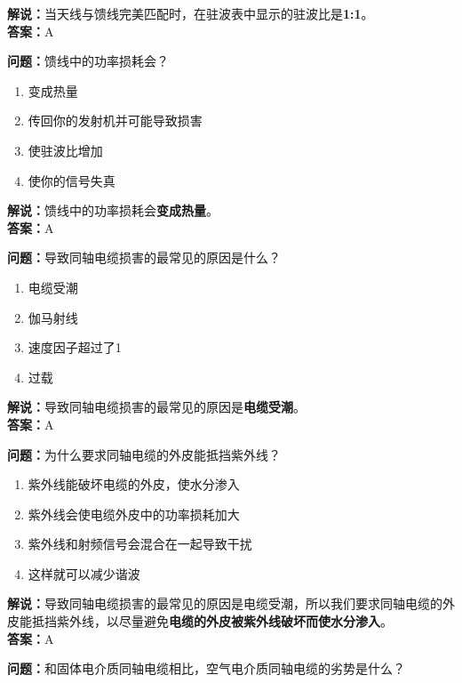 \textbf{解说：}当天线与馈线完美匹配时，在驻波表中显示的驻波比是\textbf{1:1}。\\\textbf{答案：}A



\textbf{问题：}馈线中的功率损耗会？

\begin{enumerate}[label=\Alph*), leftmargin=1cm]
	\item 变成热量
	\item 传回你的发射机并可能导致损害
	\item 使驻波比增加
	\item 使你的信号失真
\end{enumerate}

\textbf{解说：}馈线中的功率损耗会\textbf{变成热量}。\\\textbf{答案：}A



\textbf{问题：}导致同轴电缆损害的最常见的原因是什么？

\begin{enumerate}[label=\Alph*), leftmargin=1cm]
	\item 电缆受潮
	\item 伽马射线
	\item 速度因子超过了1
	\item 过载
\end{enumerate}

\textbf{解说：}导致同轴电缆损害的最常见的原因是\textbf{电缆受潮}。\\\textbf{答案：}A



\textbf{问题：}为什么要求同轴电缆的外皮能抵挡紫外线？

\begin{enumerate}[label=\Alph*), leftmargin=1cm]
	\item 紫外线能破坏电缆的外皮，使水分渗入
	\item 紫外线会使电缆外皮中的功率损耗加大
	\item 紫外线和射频信号会混合在一起导致干扰
	\item 这样就可以减少谐波
\end{enumerate}

\textbf{解说：}导致同轴电缆损害的最常见的原因是电缆受潮，所以我们要求同轴电缆的外皮能抵挡紫外线，以尽量避免\textbf{电缆的外皮被紫外线破坏而使水分渗入}。\\\textbf{答案：}A%



\textbf{问题：}和固体电介质同轴电缆相比，空气电介质同轴电缆的劣势是什么？


